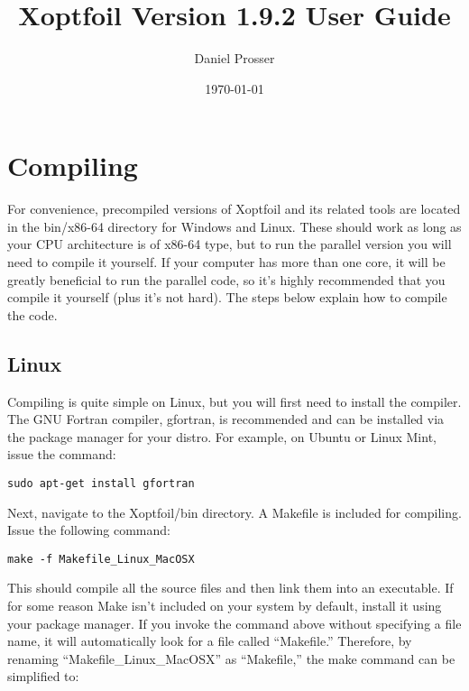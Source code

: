 \documentclass[11pt]{article}
\begin{document}
\title{Xoptfoil Version 1.9.2 User Guide}
\author{Daniel Prosser}
\date{\today}
\maketitle

\tableofcontents

\section{Compiling}

For convenience, precompiled versions of Xoptfoil and its related tools are
located in the bin/x86-64 directory for Windows and Linux. These should work as long as
your CPU architecture is of x86-64 type, but to run the parallel version you will need to
compile it yourself. If your computer has more than one core, it will be greatly
beneficial to run the parallel code, so it's highly recommended that you compile it
yourself (plus it's not hard). The steps below explain how to compile the code.

\subsection{Linux}

Compiling is quite simple on Linux, but you will first need to install the compiler. The
GNU Fortran compiler, gfortran, is recommended and can be installed via the package
manager for your distro.  For example, on Ubuntu or Linux Mint, issue the command:

\begin{verbatim}
sudo apt-get install gfortran
\end{verbatim}

Next, navigate to the Xoptfoil/bin directory.  A Makefile is included for compiling. Issue
the following command:

\begin{verbatim}
make -f Makefile_Linux_MacOSX
\end{verbatim}

This should compile all the source files and then link them into an executable.  If for
some reason Make isn't included on your system by default, install it using your package 
manager. If you invoke the command above without specifying a file name, it will 
automatically look
for a file called ``Makefile.''  Therefore, by renaming ``Makefile\_Linux\_MacOSX'' as
``Makefile,'' the make command can be simplified to:
\end{document}
